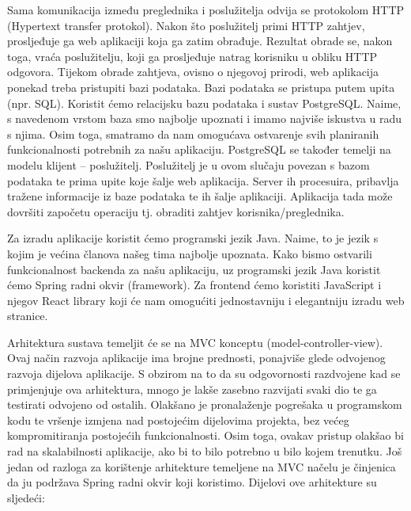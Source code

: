 Sama komunikacija između preglednika i poslužitelja odvija se protokolom HTTP (Hypertext transfer protokol). Nakon što poslužitelj primi HTTP zahtjev, prosljeđuje ga web aplikaciji koja ga zatim obrađuje. Rezultat obrade se, nakon toga, vraća poslužitelju, koji ga prosljeđuje natrag korisniku u obliku HTTP odgovora. Tijekom obrade zahtjeva, ovisno o njegovoj prirodi, web aplikacija ponekad treba pristupiti bazi podataka. Bazi podataka se pristupa putem upita (npr. SQL). Koristit ćemo relacijsku bazu podataka i sustav PostgreSQL. Naime, s navedenom vrstom baza smo najbolje upoznati i imamo najviše iskustva u radu s njima. Osim toga, smatramo da nam omogućava ostvarenje svih planiranih funkcionalnosti potrebnih za našu aplikaciju. PostgreSQL se također temelji na modelu klijent – poslužitelj. Poslužitelj je u ovom slučaju povezan s bazom podataka te prima upite koje šalje web aplikacija. Server ih procesuira, pribavlja tražene informacije iz baze podataka te ih šalje aplikaciji. Aplikacija tada može dovršiti započetu operaciju tj. obraditi zahtjev korisnika/preglednika. \vspace{\baselineskip}

Za izradu aplikacije koristit ćemo programski jezik Java. Naime, to je jezik s kojim je većina članova našeg tima najbolje upoznata. Kako bismo ostvarili funkcionalnost backenda za našu aplikaciju, uz programski jezik Java koristit ćemo Spring radni okvir (framework). Za frontend ćemo koristiti JavaScript i njegov React library koji će nam omogućiti jednostavniju i elegantniju izradu web stranice. \vspace{\baselineskip}

Arhitektura sustava temeljit će se na MVC konceptu (model-controller-view). Ovaj način razvoja aplikacije ima brojne prednosti, ponajviše glede odvojenog razvoja dijelova aplikacije. S obzirom na to da su odgovornosti razdvojene kad se primjenjuje ova arhitektura, mnogo je lakše zasebno razvijati svaki dio te ga testirati odvojeno od ostalih. Olakšano je pronalaženje pogrešaka u programskom kodu te vršenje izmjena nad postojećim dijelovima projekta, bez većeg kompromitiranja postojećih funkcionalnosti. Osim toga, ovakav pristup olakšao bi rad na skalabilnosti aplikacije, ako bi to bilo potrebno u bilo kojem trenutku. Još jedan od razloga za korištenje arhitekture temeljene na MVC načelu je činjenica da ju podržava Spring radni okvir koji koristimo. Dijelovi ove arhitekture su sljedeći:

